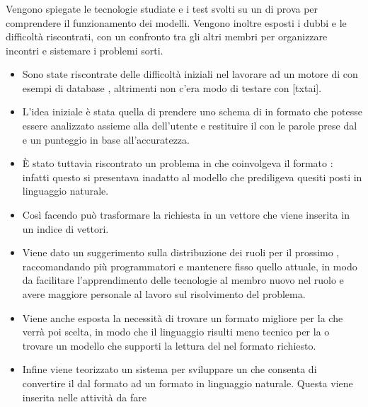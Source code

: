 \subsubsection{\Programmatore}
\par Vengono spiegate le tecnologie studiate e i test svolti su un  di prova per comprendere il funzionamento dei modelli. Vengono inoltre esposti i dubbi e le difficoltà riscontrati, con un confronto tra gli altri membri per organizzare incontri e sistemare i problemi sorti.
\begin{itemize}
	\item Sono state riscontrate delle difficoltà iniziali nel lavorare ad un motore di  con esempi di database , altrimenti non c'era modo di testare con [txtai].
	\item L'idea iniziale è stata quella di prendere uno schema di  in formato  che potesse essere analizzato assieme alla  dell'utente e restituire il  con le parole prese dal  e un punteggio in base all'accuratezza.
	\item È stato tuttavia riscontrato un problema in  che coinvolgeva il formato : infatti questo si presentava inadatto al modello che prediligeva quesiti posti in linguaggio naturale.
	\item Così facendo  può trasformare la richiesta in un vettore che viene inserita in un indice di vettori.
	\item Viene dato un suggerimento sulla distribuzione dei ruoli per il prossimo , raccomandando più programmatori e mantenere fisso quello attuale, in modo da facilitare l'apprendimento delle tecnologie al membro nuovo nel ruolo e avere maggiore personale al lavoro sul risolvimento del problema.
	\item Viene anche esposta la necessità di trovare un formato migliore per la  che verrà poi scelta, in modo che il linguaggio risulti meno tecnico per la  o trovare un modello che supporti la lettura del  nel formato richiesto.
	\item Infine viene teorizzato un sistema per sviluppare un  che consenta di convertire il  dal formato  ad un formato in linguaggio naturale. Questa viene inserita nelle attività da fare
\end{itemize}

